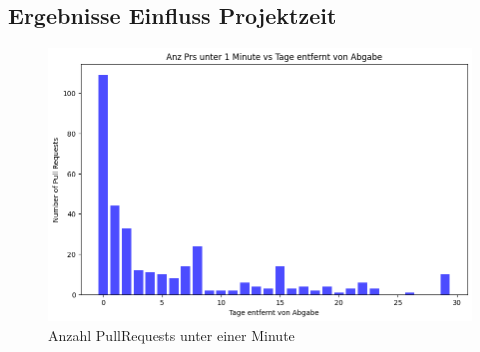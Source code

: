 \subsection{Ergebnisse Einfluss Projektzeit}
\begin{figure}[htbp]
    \includegraphics[width=\textwidth]{Figures/anz-prs-under-1-min.png}
    \caption{Anzahl PullRequests unter einer Minute}
    \label{fig:anz-prs-under-1-min}
\end{figure}
